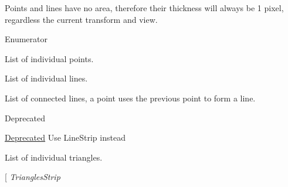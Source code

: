Points and lines have no area, therefore their thickness will always be 1 pixel, regardless the current transform and view. \begin{Desc}
\item[Enumerator]\par
\begin{description}
\item[{\em 
\hypertarget{group__graphics_gga5ee56ac1339984909610713096283b1ba85cf551ca780a29ec5df3ee9fc282c22}{Points}\label{group__graphics_gga5ee56ac1339984909610713096283b1ba85cf551ca780a29ec5df3ee9fc282c22}
}]List of individual points. \item[{\em 
\hypertarget{group__graphics_gga5ee56ac1339984909610713096283b1ba2017328f9eda40a9aade94d5c45d0e8c}{Lines}\label{group__graphics_gga5ee56ac1339984909610713096283b1ba2017328f9eda40a9aade94d5c45d0e8c}
}]List of individual lines. \item[{\em 
\hypertarget{group__graphics_gga5ee56ac1339984909610713096283b1bafc070260a0222df367922706bbeb905a}{Lines\-Strip}\label{group__graphics_gga5ee56ac1339984909610713096283b1bafc070260a0222df367922706bbeb905a}
}]List of connected lines, a point uses the previous point to form a line. \begin{DoxyRefDesc}{Deprecated}
\item[\hyperlink{deprecated__deprecated000002}{Deprecated}]Use Line\-Strip instead \end{DoxyRefDesc}
\item[{\em 
\hypertarget{group__graphics_gga5ee56ac1339984909610713096283b1babdd5e75b8944a886fdaa30e5bb3adc0d}{Triangles}\label{group__graphics_gga5ee56ac1339984909610713096283b1babdd5e75b8944a886fdaa30e5bb3adc0d}
}]List of individual triangles. \item[{\em 
\hypertarget{group__graphics_gga5ee56ac1339984909610713096283b1baf5ef0ffa5d13f9ea3e0eb18a2a8da7fb}{Triangles\-Strip}\label{group__graphics_gga5ee56ac1339984909610713096283b1baf5ef0ffa5d13f9ea3e0eb18a2a8da7fb}
}
\end{description}
\end{Desc}

